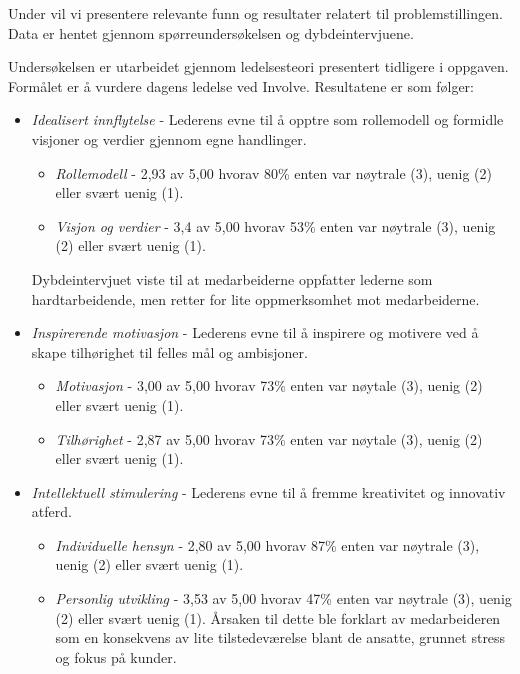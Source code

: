 Under vil vi presentere relevante funn og resultater relatert til problemstillingen. Data er hentet gjennom spørreundersøkelsen og dybdeintervjuene.

\indent \newline
Undersøkelsen er utarbeidet gjennom ledelsesteori presentert tidligere i oppgaven. Formålet er å vurdere dagens ledelse ved Involve. Resultatene er som følger: 

\begin{itemize}
\item\textit{Idealisert innflytelse} -  Lederens evne til å opptre som rollemodell og formidle visjoner og verdier gjennom egne handlinger.
\begin{itemize}
\item\textit{Rollemodell} - 2,93 av 5,00 hvorav 80\% enten var nøytrale (3), uenig (2) eller svært uenig (1).
\item\textit{Visjon og verdier} -  3,4 av 5,00 hvorav 53\% enten var nøytrale (3), uenig (2) eller svært uenig (1).
\end{itemize}
Dybdeintervjuet viste til at medarbeiderne oppfatter lederne som hardtarbeidende, men retter for lite oppmerksomhet mot medarbeiderne.

\item\textit{Inspirerende motivasjon} - Lederens evne til å inspirere og motivere ved å skape tilhørighet til felles mål og ambisjoner.
\begin{itemize}
\item\textit{Motivasjon} - 3,00 av 5,00 hvorav 73\% enten var nøytale (3), uenig (2) eller svært uenig (1).
\item\textit{Tilhørighet} - 2,87 av 5,00 hvorav 73\% enten var nøytale (3), uenig (2) eller svært uenig (1). 
\end{itemize}

\item\textit{Intellektuell stimulering} - Lederens evne til å fremme kreativitet og innovativ atferd.
\begin{itemize}
\item\textit{Individuelle hensyn} - 2,80 av 5,00 hvorav 87\% enten var nøytrale (3), uenig (2) eller svært uenig (1).
\item\textit{Personlig utvikling} - 3,53 av 5,00 hvorav 47\% enten var nøytrale (3), uenig (2) eller svært uenig (1). 
Årsaken til dette ble forklart av medarbeideren som en konsekvens av lite tilstedeværelse blant de ansatte, grunnet stress og fokus på kunder.
\end{itemize}


\end{itemize}
